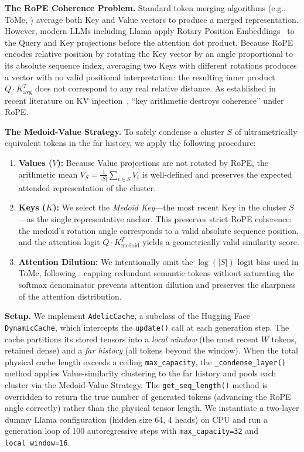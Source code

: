 \documentclass[11pt,a4paper]{article}
\begin{document}
\textbf{The RoPE Coherence Problem.} Standard token merging algorithms (e.g., ToMe, \citealt{bolya2022token}) average both Key and Value vectors to produce a merged representation. However, modern LLMs including Llama apply Rotary Position Embeddings~\citep{su2024rope} to the Query and Key projections before the attention dot product. Because RoPE encodes relative position by rotating the Key vector by an angle proportional to its absolute sequence index, averaging two Keys with different rotations produces a vector with no valid positional interpretation: the resulting inner product $Q \cdot K_{\text{avg}}^T$ does not correspond to any real relative distance. As established in recent literature on KV injection~\citep{pustovit2026knowledge}, ``key arithmetic destroys coherence'' under RoPE.

\textbf{The Medoid-Value Strategy.} To safely condense a cluster $S$ of ultrametrically equivalent tokens in the far history, we apply the following procedure:
\begin{enumerate}
    \item \textbf{Values ($V$):} Because Value projections are not rotated by RoPE, the arithmetic mean $V_S = \frac{1}{|S|} \sum_{i \in S} V_i$ is well-defined and preserves the expected attended representation of the cluster.
    \item \textbf{Keys ($K$):} We select the \emph{Medoid Key}---the most recent Key in the cluster $S$---as the single representative anchor. This preserves strict RoPE coherence: the medoid's rotation angle corresponds to a valid absolute sequence position, and the attention logit $Q \cdot K_{\text{medoid}}^T$ yields a geometrically valid similarity score.
    \item \textbf{Attention Dilution:} We intentionally omit the $\log(|S|)$ logit bias used in ToMe, following \citet{bui2026make}: capping redundant semantic tokens without saturating the softmax denominator prevents attention dilution and preserves the sharpness of the attention distribution.
\end{enumerate}

\textbf{Setup.} We implement \texttt{AdelicCache}, a subclass of the Hugging Face \texttt{DynamicCache}, which intercepts the \texttt{update()} call at each generation step. The cache partitions its stored tensors into a \emph{local window} (the most recent $W$ tokens, retained dense) and a \emph{far history} (all tokens beyond the window). When the total physical cache length exceeds a ceiling \texttt{max\_capacity}, the \texttt{\_condense\_layer()} method applies Value-similarity clustering to the far history and pools each cluster via the Medoid-Value Strategy. The \texttt{get\_seq\_length()} method is overridden to return the true number of generated tokens (advancing the RoPE angle correctly) rather than the physical tensor length. We instantiate a two-layer dummy Llama configuration (hidden size 64, 4 heads) on CPU and run a generation loop of 100 autoregressive steps with \texttt{max\_capacity=32} and \texttt{local\_window=16}.
\end{document}
